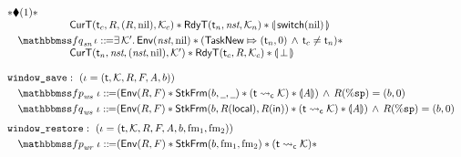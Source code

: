 \begin{figure}[!t]
\[\begin{array}{l}
            \sepstar \metricAst{1} \sepstar \\
            \hspace*{6em}
            \RelCurT{\thrdid_c}{\RFile}{(\RFile, \nil)}{\hthrdlocalst_c} \sepstar
            \RelRdyT{\thrdid_n}{\nst}{\hthrdlocalst_n} \sepstar 
            \safePrimAst{\, \primsw(\nil) \,} \\
            \\[-9pt]
            \quad
            \relspecpost_{\textit{sn}} \, \lgvl \define 
            \exists \, \hthrdlocalst'. \, 
            \Env{\nst, \nil} \sepstar 
            (\relmsto{\TaskNew}{(\thrdid_n, 0)} \, \land \, \thrdid_c \neq \thrdid_n) \sepstar \\
            \hspace*{6em}
            \RelCurT{\thrdid_n}{\nst}{(\nst, \nil)}{\hthrdlocalst'} 
            \sepstar \RelRdyT{\thrdid_c}{\RFile}{\hthrdlocalst_c}
            \sepstar \safePrimAst{\, \primdone \,}
            \\
            \\
            \texttt{window\_save}: \ (\lgvl = (\thrdid, \hthrdlocalst, \RFile, 
                \Wstack, \primcom, \block)) \\
            \\[-9pt]
            \quad
            \relspecpre_{\textit{ws}} \ \lgvl \define 
            (\Env{\RFile, \Wstack} \sepstar \RelStkFm{\block}{\notCare}{\notCare}
            \sepstar (\astCurCont{\thrdid}{\hthrdlocalst}) \sepstar 
            \safePrimAst{\primcom}) \, \land \, \RFile(\spreg) = (\block, 0) \\
            \\[-9pt]
            \quad
            \relspecpost_{\textit{ws}} \ \lgvl \define 
            (\Env{\RFile, \Wstack} \sepstar 
            \RelStkFm{\block}{\RFile(\localRN)}{\RFile(\inRN)}
            \sepstar (\astCurCont{\thrdid}{\hthrdlocalst}) \sepstar 
            \safePrimAst{\primcom}) \, \land \, \RFile(\spreg) = (\block, 0) \\
            \\[-5pt]
            \texttt{window\_restore}: \ (\lgvl = (\thrdid, \hthrdlocalst, \RFile, \Wstack, 
            \primcom, \block, \fm_1, \fm_2)) \\
            \\[-9pt]
            \quad
            \relspecpre_{\textit{wr}} \ \lgvl \define 
            (\Env{\RFile, \Wstack} \sepstar \RelStkFm{\block}{\fm_1}{\fm_2} 
            \sepstar (\astCurCont{\thrdid}{\hthrdlocalst}) \sepstar 

\end{array}\]
\end{figure}
